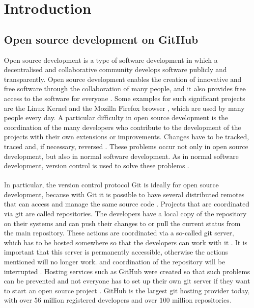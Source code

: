 \documentclass[sigconf]{acmart}
\begin{document}
\section{Introduction}
\subsection{Open source development on GitHub}
Open source development is a type of software development in which a decentralised and collaborative 
community develops software publicly and transparently. Open source development enables the creation 
of innovative and free software through the collaboration of many people, and it also provides free access 
to the software for everyone \cite{shaikh2017governing, redhat2021ops}. Some examples for such significant 
projects are the Linux Kernel \cite{linux2021ops} and the Mozilla Firefox browser \cite{mozilla2021ops}, which are 
used by many people  every day. A particular difficulty in open source development is the coordination of the many 
developers who contribute to the development of the projects with their own extensions or improvements. Changes have 
to be tracked, traced and, if necessary, reversed \cite{shaikh2017governing}. These problems occur not only in open 
source development, but also in normal software development. As in normal software development, version control is 
used to solve these problems \cite{shaikh2017governing, ulrich2020dev}. \\ \\
In particular, the version control protocol Git 
is ideally for open source development, because with Git it is possible to have several distributed remotes that can 
access and manage the same source code \cite{git2021scm, ulrich2020dev}. Projects that are coordinated via git are 
called repositories. The developers have a local copy of the repository on their systems and can push their changes to or 
pull the current status from the main repository. These actions are coordinated via a so-called git server, which has to be 
hosted somewhere so that the developers can work with it \cite{git2021scm}. It is important that this server is permanently 
accessible, otherwise the actions mentioned will no longer work. and coordination of the repository will be 
interrupted \cite{ulrich2020dev}. Hosting services such as GitHub were created so that such problems can be prevented 
and not everyone has to set up their own git server if they want to start an open source project \cite{ulrich2020dev, git2021hub}.
GitHub is the largest git hosting provider today, with over 56 million registered developers and over 100 million repositories.
\end{document}
